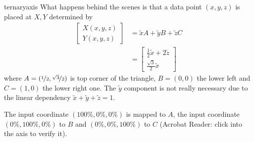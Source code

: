 \begin{environment}{{ternaryaxis}}
    What happens behind the scenes is that a data point $(x,y,z)$ is placed at
    $X,Y$ determined by
        \begin{align*}
            \begin{bmatrix}
                X(x,y,z)\\
                Y(x,y,z)
            \end{bmatrix}
            &=
            \tilde x A + \tilde y B + \tilde z C \\
            &=
            \begin{bmatrix}
                \frac12 {\tilde x+2 \tilde z}\\
                \frac{\sqrt 3}{2} {\tilde x}
            \end{bmatrix}
        \end{align*}
    where $A=(\nicefrac12,\nicefrac{\sqrt3}{2})$ is top corner of the triangle,
    $B=(0,0)$ the lower left and $C=(1,0)$ the lower right one. The $\tilde y$
    component is not really necessary due to the linear dependency $\tilde
    x+\tilde y+\tilde z=1$.

    The input coordinate $(100\%,0\%,0\%)$ is mapped to $A$, the input
    coordinate $(0\%,100\%,0\%)$ to $B$ and $(0\%,0\%,100\%)$ to $C$ (Acrobat
    Reader: click into the axis to verify it).
\begin{codeexample}[]
\end{codeexample}
\end{environment}

